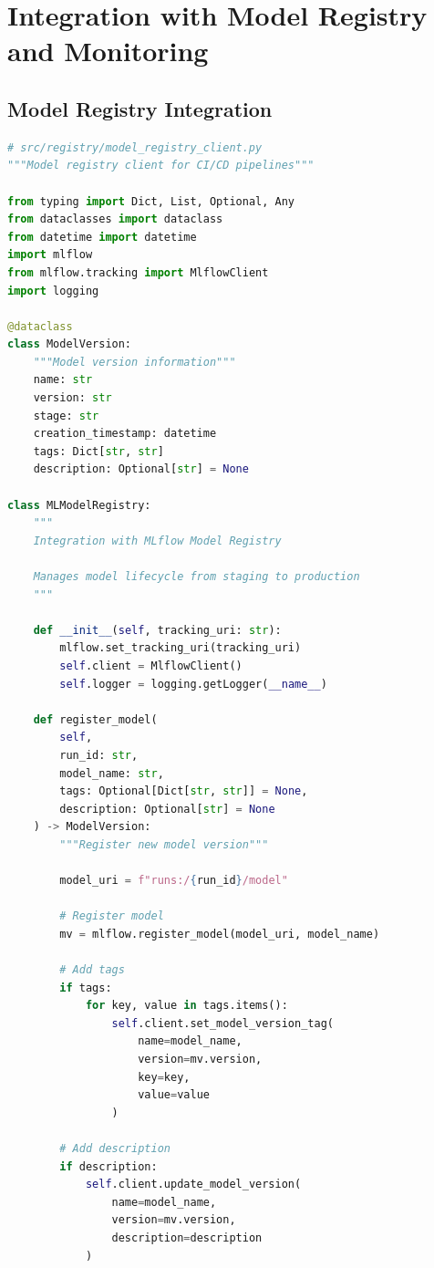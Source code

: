 \section{Integration with Model Registry and Monitoring}

\subsection{Model Registry Integration}

\begin{lstlisting}[language=Python, caption=Model Registry Integration for CI/CD]
# src/registry/model_registry_client.py
"""Model registry client for CI/CD pipelines"""

from typing import Dict, List, Optional, Any
from dataclasses import dataclass
from datetime import datetime
import mlflow
from mlflow.tracking import MlflowClient
import logging

@dataclass
class ModelVersion:
    """Model version information"""
    name: str
    version: str
    stage: str
    creation_timestamp: datetime
    tags: Dict[str, str]
    description: Optional[str] = None

class MLModelRegistry:
    """
    Integration with MLflow Model Registry

    Manages model lifecycle from staging to production
    """

    def __init__(self, tracking_uri: str):
        mlflow.set_tracking_uri(tracking_uri)
        self.client = MlflowClient()
        self.logger = logging.getLogger(__name__)

    def register_model(
        self,
        run_id: str,
        model_name: str,
        tags: Optional[Dict[str, str]] = None,
        description: Optional[str] = None
    ) -> ModelVersion:
        """Register new model version"""

        model_uri = f"runs:/{run_id}/model"

        # Register model
        mv = mlflow.register_model(model_uri, model_name)

        # Add tags
        if tags:
            for key, value in tags.items():
                self.client.set_model_version_tag(
                    name=model_name,
                    version=mv.version,
                    key=key,
                    value=value
                )

        # Add description
        if description:
            self.client.update_model_version(
                name=model_name,
                version=mv.version,
                description=description
            )


\end{lstlisting}
